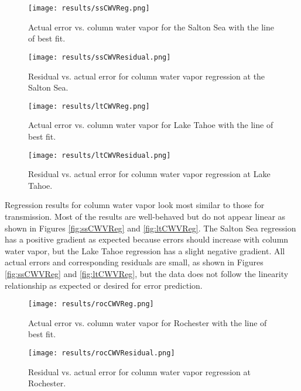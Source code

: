 \documentclass{book}
\begin{document}
\begin{figure}[H]
\begin{minipage}[b]{0.47\textwidth}
\centering
\texttt{[image: results/ssCWVReg.png]}
\caption{Actual error vs. column water vapor for the Salton Sea with the line of best fit.}
\label{fig:ssCWVReg}
\end{minipage}
\begin{minipage}[b]{0.47\textwidth}
\centering
\texttt{[image: results/ssCWVResidual.png]}
\caption{Residual vs. actual error for column water vapor regression at the Salton Sea.}
\label{fig:ssCWVResidual}
\end{minipage}
\end{figure}

\begin{figure}[H]
\begin{minipage}[b]{0.47\textwidth}
\centering
\texttt{[image: results/ltCWVReg.png]}
\caption{Actual error vs. column water vapor for Lake Tahoe with the line of best fit.}
\label{fig:ltCWVReg}
\end{minipage}
\begin{minipage}[b]{0.47\textwidth}
\centering
\texttt{[image: results/ltCWVResidual.png]}
\caption{Residual vs. actual error for column water vapor regression at Lake Tahoe.}
\label{fig:ltCWVResidual}
\end{minipage}
\end{figure}

Regression results for column water vapor look most similar to those for transmission.  Most of the results are well-behaved but do not appear linear as shown in Figures \ref{fig:ssCWVReg} and \ref{fig:ltCWVReg}.  The Salton Sea regression has a positive gradient as expected because errors should increase with column water vapor, but the Lake Tahoe regression has a slight negative gradient.  All actual errors and corresponding residuals are small, as shown in Figures \ref{fig:ssCWVReg} and \ref{fig:ltCWVReg}, but the data does not follow the linearity relationship as expected or desired for error prediction.

\begin{figure}[H]
\begin{minipage}[b]{0.47\textwidth}
\centering
\texttt{[image: results/rocCWVReg.png]}
\caption{Actual error vs. column water vapor for Rochester with the line of best fit.}
\label{fig:rocCWVReg}
\end{minipage}
\begin{minipage}[b]{0.47\textwidth}
\centering
\texttt{[image: results/rocCWVResidual.png]}
\caption{Residual vs. actual error for column water vapor regression at Rochester.}
\label{fig:rocCWVResidual}
\end{minipage}
\end{figure}
\end{document}
